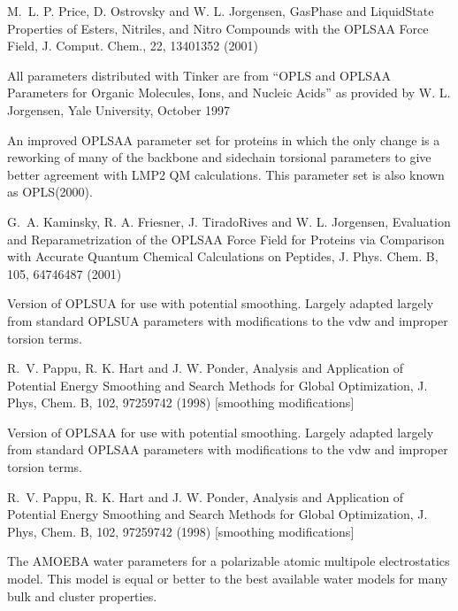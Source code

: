 \documentclass[letterpaper,11pt,english]{sphinxmanual}
\begin{document}
M. L. P. Price, D. Ostrovsky and W. L. Jorgensen, Gas\sphinxhyphen{}Phase and Liquid\sphinxhyphen{}State Properties of Esters, Nitriles, and Nitro Compounds with the OPLS\sphinxhyphen{}AA Force Field, J. Comput. Chem., 22, 1340\sphinxhyphen{}1352 (2001)

All parameters distributed with Tinker are from “OPLS and OPLS\sphinxhyphen{}AA Parameters for Organic Molecules, Ions, and Nucleic Acids” as provided by W. L. Jorgensen, Yale University, October 1997


An improved OPLS\sphinxhyphen{}AA parameter set for proteins in which the only change is a reworking of many of the backbone and sidechain torsional parameters to give better agreement with LMP2 QM calculations. This parameter set is also known as OPLS(2000).

G. A. Kaminsky, R. A. Friesner, J. Tirado\sphinxhyphen{}Rives and W. L. Jorgensen, Evaluation and Reparametrization of the OPLS\sphinxhyphen{}AA Force Field for Proteins via Comparison with Accurate Quantum Chemical Calculations on Peptides, J. Phys. Chem. B, 105, 6474\sphinxhyphen{}6487 (2001)


Version of OPLS\sphinxhyphen{}UA for use with potential smoothing. Largely adapted largely from standard OPLS\sphinxhyphen{}UA parameters with modifications to the vdw and improper torsion terms.

R. V. Pappu, R. K. Hart and J. W. Ponder, Analysis and Application of Potential Energy Smoothing and Search Methods for Global Optimization, J. Phys, Chem. B, 102, 9725\sphinxhyphen{}9742 (1998)  {[}smoothing modifications{]}


Version of OPLS\sphinxhyphen{}AA for use with potential smoothing. Largely adapted largely from standard OPLS\sphinxhyphen{}AA parameters with modifications to the vdw and improper torsion terms.

R. V. Pappu, R. K. Hart and J. W. Ponder, Analysis and Application of Potential Energy Smoothing and Search Methods for Global Optimization, J. Phys, Chem. B, 102, 9725\sphinxhyphen{}9742 (1998)  {[}smoothing modifications{]}


The AMOEBA water parameters for a polarizable atomic multipole electrostatics model. This model is equal or better to the best available water models for many bulk and cluster properties.
\end{document}
